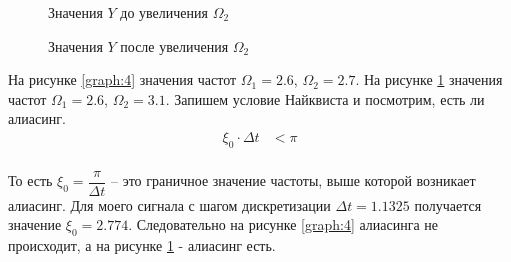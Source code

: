 \documentclass[12pt, a4paper]{article}
\begin{document}
\begin{figure}[h]
\begin{minipage}{0.45\textwidth}
    \caption{\label{graph:4}Значения $Y$ до увеличения $\Omega_2$}
\end{minipage} \hfill
\begin{minipage}{0.45\textwidth}
    \caption{\label{graph:5}Значения $Y$ после увеличения $\Omega_2$}
\end{minipage}
\end{figure}

На рисунке \ref{graph:4} значения частот $\Omega_1 = 2.6$, $\Omega_2 = 2.7$. На рисунке \ref{graph:5} значения частот $\Omega_1 = 2.6$, $\Omega_2 = 3.1$. Запишем условие Найквиста и посмотрим, есть ли алиасинг.
\begin{equation*}
\begin{split}
    \xi_0 \cdot \Delta t & < \pi \\
\end{split}
\end{equation*}

То есть $\xi_0 = \dfrac{\pi}{\Delta t}$ -- это граничное значение частоты, выше которой возникает алиасинг. Для моего сигнала с шагом дискретизации $\Delta t = 1.1325$ получается значение $\xi_0 = 2.774$. Следовательно на рисунке \ref{graph:4} алиасинга не происходит, а на рисунке \ref{graph:5} - алиасинг есть.
\end{document}
